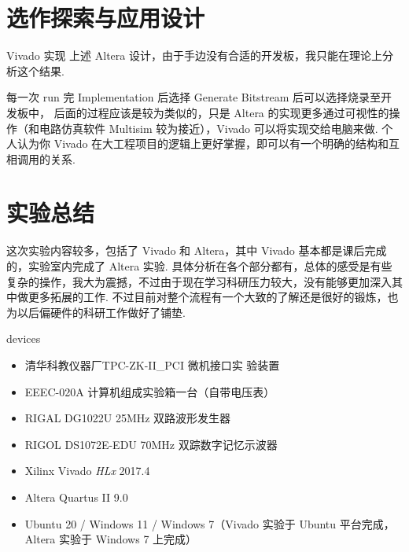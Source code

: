 \documentclass[11pt]{SEU-Digital-Report}
\begin{document}
    \newpage
    \section{选作探索与应用设计}

      Vivado 实现 上述 Altera 设计，由于手边没有合适的开发板，我只能在理论上分析这个结果.

      每一次 run 完 Implementation 后选择 Generate Bitstream 后可以选择烧录至开发板中，
      后面的过程应该是较为类似的，只是 Altera 的实现更多通过可视性的操作（和电路仿真软件 Multisim 较为接近），Vivado 可以将实现交给电脑来做.
      个人认为你 Vivado 在大工程项目的逻辑上更好掌握，即可以有一个明确的结构和互相调用的关系.

    \section{实验总结}

      这次实验内容较多，包括了 Vivado 和 Altera，其中 Vivado 基本都是课后完成的，实验室内完成了 Altera 实验.
      具体分析在各个部分都有，总体的感受是有些复杂的操作，我大为震撼，不过由于现在学习科研压力较大，没有能够更加深入其中做更多拓展的工作.
      不过目前对整个流程有一个大致的了解还是很好的锻炼，也为以后偏硬件的科研工作做好了铺垫.

      \begin{device}{}{devices}
        \begin{itemize}
          \item 清华科教仪器厂TPC-ZK-II\_PCI 微机接口实
          验装置
          \item EEEC-020A 计算机组成实验箱一台（自带电压表）
          \item RIGAL DG1022U 25MHz 双路波形发生器
          \item RIGOL DS1072E-EDU 70MHz 双踪数字记忆示波器
          \item Xilinx Vivado \textit{HLx} 2017.4
          \item Altera Quartus II 9.0
          \item Ubuntu 20 / Windows 11 / Windows 7{\kaishu\color{gray}（Vivado 实验于 Ubuntu 平台完成，Altera 实验于 Windows 7 上完成）}
        \end{itemize}
      \end{device}

    \printbibliography[sorting=none]

\end{document}
